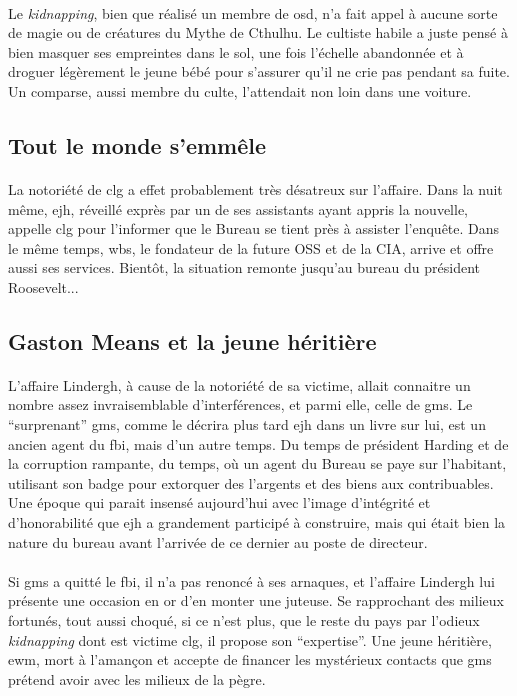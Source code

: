 \paragraph{} Le \emph{kidnapping}, bien que réalisé un membre de \gls{osd}, n'a fait appel à aucune sorte de magie ou de créatures
du Mythe de Cthulhu. Le cultiste habile a juste pensé à bien masquer ses empreintes dans le sol, une fois l'échelle abandonnée et 
à droguer légèrement le jeune bébé pour s'assurer qu'il ne crie pas pendant sa fuite. Un comparse, aussi membre du culte, l'attendait
non loin dans une voiture.
\subsection{Tout le monde s'emmêle}
\paragraph{} La notoriété de \gls{clg} a effet probablement très désatreux sur l'affaire. Dans la nuit même, \gls{ejh}, réveillé exprès
par un de ses assistants ayant appris la nouvelle, appelle \gls{clg} pour l'informer que le Bureau se tient près à assister l'enquête.
Dans le même temps, \gls{wbs}, le fondateur de la future OSS et de la CIA, arrive et offre aussi ses services. Bientôt, la situation
remonte jusqu'au bureau du président Roosevelt...
\subsection{Gaston Means et la jeune héritière}
\paragraph{} L'affaire Lindergh, à cause de la notoriété de sa victime, allait connaitre un nombre assez invraisemblable d'interférences, 
et parmi elle, celle de \gls{gms}. Le ``surprenant'' \gls{gms}, comme le décrira plus tard \gls{ejh} dans un livre sur lui, est un ancien
agent du \gls{fbi}, mais d'un autre temps. Du temps de président Harding et de la corruption rampante, du temps, où un agent du Bureau se
paye sur l'habitant, utilisant son badge pour extorquer des l'argents et des biens aux contribuables. Une époque qui parait insensé 
aujourd'hui avec l'image d'intégrité et d'honorabilité que \gls{ejh} a grandement participé à construire, mais qui était bien la nature
du bureau avant l'arrivée de ce dernier au poste de directeur.
\paragraph{} Si \gls{gms} a quitté le \gls{fbi}, il n'a pas renoncé à ses arnaques, et l'affaire Lindergh lui présente une occasion en
or d'en monter une juteuse. Se rapprochant des milieux fortunés, tout aussi choqué, si ce n'est plus, que le reste du pays par l'odieux
\emph{kidnapping} dont est victime \gls{clg}, il propose son ``expertise''. Une jeune héritière, \gls{ewm}, mort à l'amançon et accepte 
de financer les mystérieux contacts que \gls{gms} prétend avoir avec les milieux de la pègre. 
